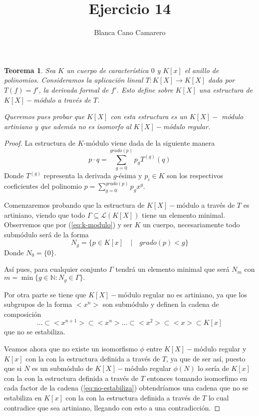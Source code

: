 \documentclass{article}
\title{Ejercicio 14}
\author{Blanca Cano Camarero}
\newtheorem*{teorema*}{Teorema}
\newcommand{\N}{\mathbb{N}}
\begin{document}
\maketitle

\begin{teorema*}
    Sea $K$ un cuerpo de característica $0$ y $K[x]$ el anillo de polinomios. Consideramos la aplicación lineal $T: K[X] \longrightarrow K[X]$ 
    dada por $T(f) = f'$, 
    la derivada formal de $f'$.
    Esto define sobre $K[X]$ una estructura de $K[X]-$módulo a través de $T$. 

    Queremos pues probar que $K[X]$ con esta estructura es un $K[X]-$ módulo artiniano y que además no es isomorfo al $K[X]-$módulo regular.
\end{teorema*}   

\begin{proof}

    La estructura de $K$-módulo viene dada de la siguiente manera 
    \begin{equation}\label{eq:k-modulo}
        p \cdot q = \sum^{grado(p)}_{g = 0} p_g T^{(g)}(q)
    \end{equation}
    Donde $T^{(g)}$ representa la derivada $g$-ésima y $p_i \in K$ son los respectivos coeficientes del polinomio $p = \sum^{grado(p)}_{g = 0} p_g x^g$. 

    Comenzaremos probando que la estructura de $K[X]-$módulo a través de $T$ es artiniano, viendo que todo 
    $\Gamma \subseteq \mathcal{L}(K[X])$ tiene un elemento minimal.
    Observemos que por (\ref{eq:k-modulo}) y ser $K$ un cuerpo, necesariamente todo submódulo será de la forma 
    \begin{equation}
        N_g = 
        \{
            p \in K[x] \quad |  \quad grado(p) < g
        \}
    \end{equation}
    Donde $N_0 = \{0\}$. 

    Así pues, para cualquier conjunto $\Gamma$ tendrá un elemento minimal que será $N_m$ con $m = \min\{ g \in \N : N_g \in \Gamma\}.$


    Por otra parte se tiene que 
    $K[X]-$módulo regular no es artiniano, ya que los subgrupos de la forma 
    $<x^n>$ son submódulo y definen la cadena de composición 
    \begin{equation} \label{eq:no-estabiliza}
        \ldots \subset <x^{n+1}>
        \subset <x^{n}>
        \ldots 
        \subset <x^{2}>
        \subset <x>
        \subset K[x]
    \end{equation}
    que no se estabiliza. 

    Veamos ahora que no existe un isomorfismo $\phi$ entre  $K[X]-$módulo regular 
    y $K[x]$ con la con la estructura definida a través de $T$, ya que de ser así, puesto que si $N$ es un submódulo de 
    $K[X]-$módulo regular $\phi(N)$ lo sería de  $K[x]$ con la con la estructura definida a través de $T$ 
    entonces tomando isomorfimo en cada factor de la cadena (\ref{eq:no-estabiliza}) obtendríamos una cadena que no se estabiliza en $K[x]$ con la con la estructura definida a través de $T$ lo cual contradice que sea artiniano, llegando con esto a una contradicción.


\end{proof}
\end{document}
